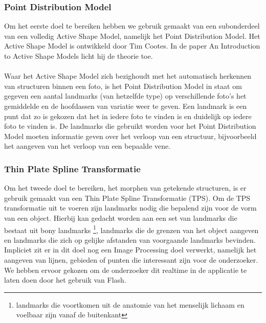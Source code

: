 \subsubsection{Point Distribution Model}
Om het eerste doel te bereiken hebben we gebruik gemaakt van een subonderdeel van een volledig Active Shape Model, namelijk het Point Distribution Model. Het Active Shape Model is ontwikkeld door Tim Cootes. In de paper An Introduction to Active Shape Models licht hij de theorie toe.\cite{introASM}
\\
\\
Waar het Active Shape Model zich bezighoudt met het automatisch herkennen van structuren binnen een foto, is het Point Distribution Model\cite{pdm} in staat om gegeven een aantal landmarks (van hetzelfde type) op verschillende foto's het gemiddelde en de hoofdassen van variatie weer te geven. Een landmark is een punt dat zo is gekozen dat het in iedere foto te vinden is en duidelijk op iedere foto te vinden is. De landmarks die gebruikt worden voor het Point Distribution Model moeten informatie geven over het verloop van een structuur, bijvoorbeeld het aangeven van het verloop van een bepaalde vene.

\subsubsection{Thin Plate Spline Transformatie}
Om het tweede doel te bereiken, het morphen van getekende structuren, is er gebruik gemaakt van een Thin Plate Spline Transformatie (TPS). Om de TPS transformatie uit te voeren zijn landmarks nodig die bepalend zijn voor de vorm van een object. Hierbij kan gedacht worden aan een set van landmarks die bestaat uit bony landmarks \footnote{landmarks die voortkomen uit de anatomie van het menselijk lichaam en voelbaar zijn vanaf de buitenkant}, landmarks die de grenzen van het object aangeven en landmarks die zich op gelijke afstanden van voorgaande landmarks bevinden. 
Impliciet zit er in dit doel nog een Image Processing doel verwerkt, namelijk het aangeven van lijnen, gebieden of punten die interessant zijn voor de onderzoeker. We hebben ervoor gekozen om de onderzoeker dit realtime in de applicatie te laten doen door het gebruik van Flash.


